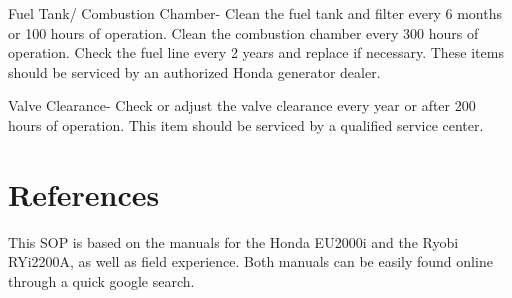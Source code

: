 \documentclass[12pt]{../SOP3_beta}
\begin{document}
\NP Fuel Tank/ Combustion Chamber- Clean the fuel tank and filter every 6 months or 100 hours of operation. Clean the combustion chamber every 300 hours of operation. Check the fuel line every 2 years and replace if necessary. These items should be serviced by an authorized Honda generator dealer.

\NP Valve Clearance- Check or adjust the valve clearance every year or after 200 hours of operation. This item should be serviced by a qualified service center.




\section{References}

\NP This SOP is based on the manuals for the Honda EU2000i and the Ryobi RYi2200A, as well as field experience. Both manuals can be easily found online through a quick google search.  
\end{document}

